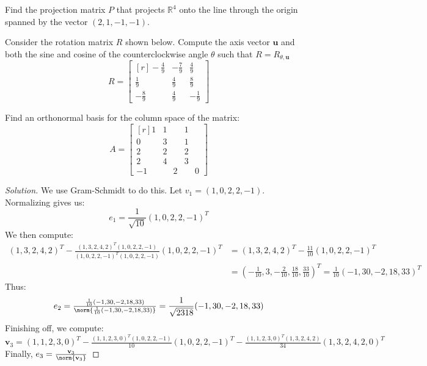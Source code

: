 \documentclass[crop=false,class=book,oneside]{standalone}                      %
\begin{document}
        \begin{problem}
        Find the projection matrix $P$ that projects $\mathbb{R}^4$ onto the line through the origin spanned by the vector $(2,1,-1,-1)$.
        \end{problem}
        \begin{problem}
        Consider the rotation matrix $R$ shown below. Compute the axis vector $\textbf{u}$ and both the sine and cosine of the counterclockwise angle $\theta$ such that $R = R_{\theta,\textbf{u}}$
        \begin{equation*}
            R = \begin{bmatrix*}[r] -\frac{4}{9} & -\frac{7}{9} & \frac{4}{9} \\ \frac{1}{9} & \frac{4}{9} & \frac{8}{9} \\ -\frac{8}{9} & \frac{4}{9} & -\frac{1}{9} \end{bmatrix*}
        \end{equation*}
        \end{problem}
        \begin{problem}
        Find an orthonormal basis for the column space of the matrix:
        \begin{equation*}
            A = \begin{bmatrix*}[r] 1 & 1 & 1 \\ 0 & 3 & 1 \\ 2 & 2 & 2 \\ 2 & 4 & 3 \\ -1 & \phantom{-}2 & \phantom{-}0 \end{bmatrix*}
        \end{equation*}
        \end{problem}
        \begin{proof}[Solution]
        We use Gram-Schmidt to do this. Let $v_{1}=(1,0,2,2,-1)$. Normalizing gives us:
        \begin{equation*}
            e_{1} = \frac{1}{\sqrt{10}}(1,0,2,2,-1)^T    
        \end{equation*}
        We then compute:
        \begin{align*}
            (1,3,2,4,2)^T-\tfrac{(1,3,2,4,2)^T(1,0,2,2,-1)}{(1,0,2,2,-1)^T (1,0,2,2,-1)}(1,0,2,2,-1)^{T}&=(1,3,2,4,2)^{T}-\tfrac{11}{10}(1,0,2,2,-1)^{T}\\
            &=(-\tfrac{1}{10},3,-\tfrac{2}{10},\tfrac{18}{10},\tfrac{33}{10})^{T}=\tfrac{1}{10}(-1,30,-2,18,33)^{T}
        \end{align*}
        Thus:
        \begin{equation*}
            e_{2}=\tfrac{\frac{1}{10}(-1,30,-2,18,33)}{\norm{\frac{1}{10}(-1,30,-2,18,33)}}=\frac{1}{\sqrt{2318}}(-1,30,-2,18,33)
        \end{equation*}
        Finishing off, we compute:
        \begin{equation*}
            \mathbf{v}_{3}=(1,1,2,3,0)^{T}-\tfrac{(1,1,2,3,0)^T(1,0,2,2,-1)}{10}(1,0,2,2,-1)^T-\tfrac{(1,1,2,3,0)^T(1,3,2,4,2)}{34}(1,3,2,4,2,0)^{T}
        \end{equation*}
        Finally, $e_3=\frac{\textbf{v}_{3}}{\norm{\textbf{v}_{3}}}$
        \end{proof}
\end{document}
